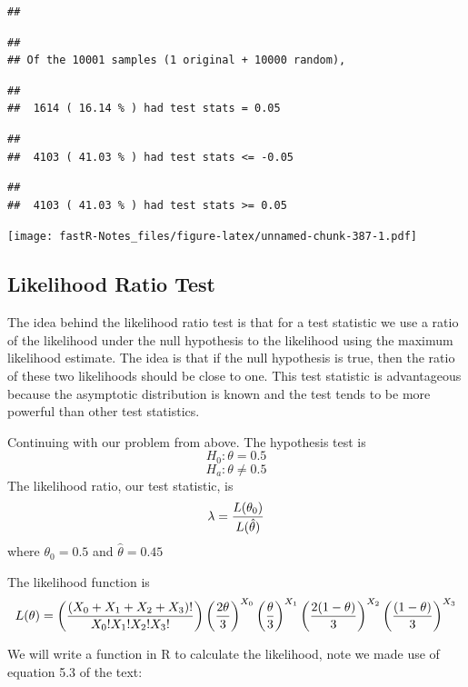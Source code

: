\documentclass[]{book}
\theoremstyle{definition}
\theoremstyle{definition}
\theoremstyle{definition}
\theoremstyle{remark}
\begin{document}
\begin{verbatim}
## 
\end{verbatim}

\begin{verbatim}
## 
## Of the 10001 samples (1 original + 10000 random),
\end{verbatim}

\begin{verbatim}
## 
##  1614 ( 16.14 % ) had test stats = 0.05
\end{verbatim}

\begin{verbatim}
## 
##  4103 ( 41.03 % ) had test stats <= -0.05
\end{verbatim}

\begin{verbatim}
## 
##  4103 ( 41.03 % ) had test stats >= 0.05
\end{verbatim}

\texttt{[image: fastR-Notes\_files/figure-latex/unnamed-chunk-387-1.pdf]}

\subsection{Likelihood Ratio Test}\label{likelihood-ratio-test}

The idea behind the likelihood ratio test is that for a test statistic
we use a ratio of the likelihood under the null hypothesis to the
likelihood using the maximum likelihood estimate. The idea is that if
the null hypothesis is true, then the ratio of these two likelihoods
should be close to one. This test statistic is advantageous because the
asymptotic distribution is known and the test tends to be more powerful
than other test statistics.

Continuing with our problem from above. The hypothesis test is
\[H_{0}: \theta = 0.5\] \[H_{a}: \theta \neq 0.5\] The likelihood ratio,
our test statistic, is \[\lambda={L(\theta_{0}) \over L(\hat{\theta})}\]
where \(\theta_{0}=0.5\) and \(\hat{\theta}=0.45\)

The likelihood function is
\[L(\theta)= \left( {\left(X_{0}+X_{1}+X_{2}+X_{3} \right)! \over X_{0}!X_{1}!X_{2}!X_{3}!} \right) \left( {2 \theta \over 3} \right)^{X_{0}}\left( { \theta \over 3} \right)^{X_{1}}\left( {2 (1- \theta) \over 3} \right)^{X_{2}}\left( {(1 - \theta ) \over 3} \right)^{X_{3}}\]

We will write a function in R to calculate the likelihood, note we made
use of equation 5.3 of the text:
\end{document}
